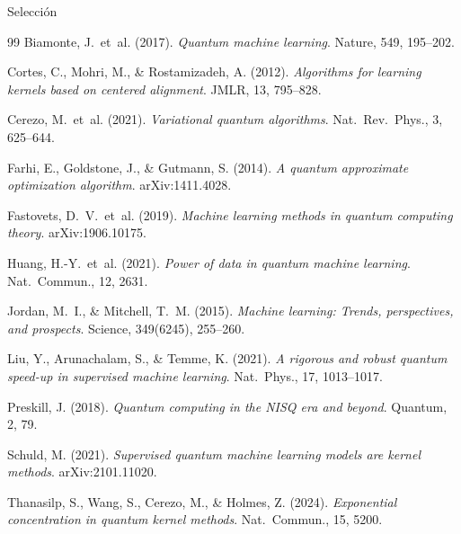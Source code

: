 \documentclass[aspectratio=169,10pt,professionalfonts]{beamer}
\begin{document}
\begin{frame}[allowframebreaks]{Selección}

\begin{thebibliography}{99}
Biamonte, J.\ et~al. (2017). \emph{Quantum machine learning}. Nature, 549, 195--202.

Cortes, C., Mohri, M., \& Rostamizadeh, A. (2012). \emph{Algorithms for learning kernels based on centered alignment}. JMLR, 13, 795--828.

Cerezo, M.\ et~al. (2021). \emph{Variational quantum algorithms}. Nat.\ Rev.\ Phys., 3, 625--644.

Farhi, E., Goldstone, J., \& Gutmann, S. (2014). \emph{A quantum approximate optimization algorithm}. arXiv:1411.4028.

Fastovets, D.\ V.\ et~al. (2019). \emph{Machine learning methods in quantum computing theory}. arXiv:1906.10175.

Huang, H.-Y.\ et~al. (2021). \emph{Power of data in quantum machine learning}. Nat.\ Commun., 12, 2631.

Jordan, M.\ I., \& Mitchell, T.\ M. (2015). \emph{Machine learning: Trends, perspectives, and prospects}. Science, 349(6245), 255--260.

Liu, Y., Arunachalam, S., \& Temme, K. (2021). \emph{A rigorous and robust quantum speed-up in supervised machine learning}. Nat.\ Phys., 17, 1013--1017.

Preskill, J. (2018). \emph{Quantum computing in the NISQ era and beyond}. Quantum, 2, 79.

Schuld, M. (2021). \emph{Supervised quantum machine learning models are kernel methods}. arXiv:2101.11020.

Thanasilp, S., Wang, S., Cerezo, M., \& Holmes, Z. (2024). \emph{Exponential concentration in quantum kernel methods}. Nat.\ Commun., 15, 5200.
\end{thebibliography}
\end{frame}
\end{document}
